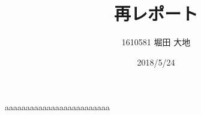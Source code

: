 \documentclass[twocolumn, 10pt,a4j]{jsarticle}
\title{\vspace{-2.5cm}再レポート}
\author{1610581 堀田 大地}
\date{2018/5/24}
\begin{document}
\maketitle{}
aaaaaaaaaaaaaaaaaaaaaaaaa
\end{document}
